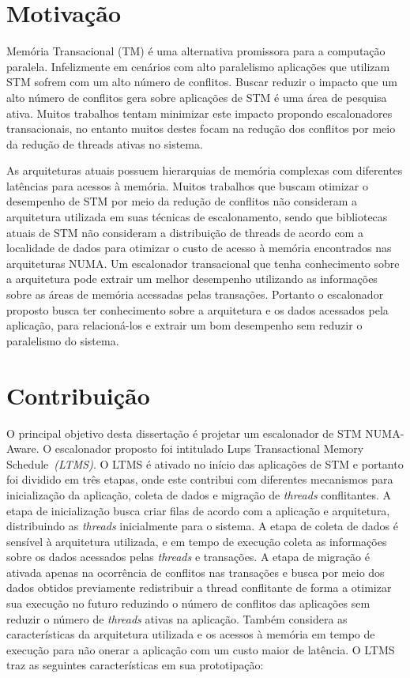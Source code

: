 \documentclass[diss,capa]{texufpel}
\begin{document}
\section{Motivação}

Memória Transacional (TM) é uma alternativa promissora para a computação paralela. Infelizmente em cenários com alto paralelismo aplicações que utilizam STM sofrem com um alto número de conflitos. Buscar reduzir o impacto que um alto número de conflitos gera sobre aplicações de STM é uma área de pesquisa ativa. Muitos trabalhos tentam minimizar este impacto propondo escalonadores transacionais, no entanto muitos destes focam na redução dos conflitos por meio da redução de threads ativas no sistema.

As arquiteturas atuais possuem hierarquias de memória complexas com diferentes latências para acessos à memória. Muitos trabalhos que buscam otimizar o desempenho de STM por meio da redução de conflitos não consideram a arquitetura utilizada em suas técnicas de escalonamento, sendo que bibliotecas atuais de STM não consideram a distribuição de threads de acordo com a localidade de dados para otimizar o custo de acesso à memória encontrados nas arquiteturas NUMA. Um escalonador transacional que tenha conhecimento sobre a arquitetura pode extrair um melhor desempenho utilizando as informações sobre as áreas de memória acessadas pelas transações. Portanto o escalonador proposto busca ter conhecimento sobre a arquitetura e os dados acessados pela aplicação, para relacioná-los e extrair um bom desempenho sem reduzir o paralelismo do sistema.

\section{Contribuição}

O principal objetivo desta dissertação é projetar um escalonador de STM NUMA-Aware. O escalonador proposto foi intitulado Lups Transactional Memory Schedule~\emph{(LTMS)}. O LTMS é ativado no início das aplicações de STM e portanto foi dividido em três etapas, onde este contribui com diferentes mecanismos para inicialização da aplicação, coleta de dados e migração de \emph{threads} conflitantes. A etapa de inicialização busca criar filas de acordo com a aplicação e arquitetura, distribuindo as \emph{threads} inicialmente para o sistema. A etapa de coleta de dados é sensível à arquitetura utilizada, e em tempo de execução coleta as informações sobre os dados acessados pelas \emph{threads} e transações. A etapa de migração é ativada apenas na ocorrência de conflitos nas transações e busca por meio dos dados obtidos previamente redistribuir a thread conflitante de forma a otimizar sua execução no futuro reduzindo o número de conflitos das aplicações sem reduzir o número de \emph{threads} ativas na aplicação. Também considera as características da arquitetura utilizada e os acessos à memória em tempo de execução para não onerar a aplicação com um custo maior de latência. O LTMS traz as seguintes características em sua prototipação:
\end{document}
